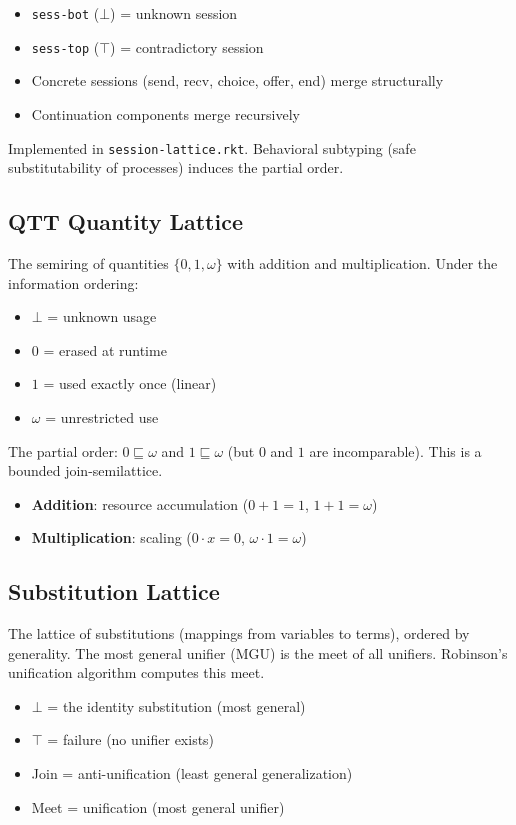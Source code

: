 \documentclass[11pt]{article}
\begin{document}
\begin{itemize}
\item \texttt{sess-bot} (\(\bot\)) = unknown session
\item \texttt{sess-top} (\(\top\)) = contradictory session
\item Concrete sessions (send, recv, choice, offer, end) merge structurally
\item Continuation components merge recursively
\end{itemize}

Implemented in \texttt{session-lattice.rkt}. Behavioral subtyping (safe substitutability
of processes) induces the partial order.
\subsection{QTT Quantity Lattice}
\label{sec:org475da16}

The semiring of quantities \(\{0, 1, \omega\}\) with addition and multiplication.
Under the information ordering:

\begin{itemize}
\item \(\bot\) = unknown usage
\item \(0\) = erased at runtime
\item \(1\) = used exactly once (linear)
\item \(\omega\) = unrestricted use
\end{itemize}

The partial order: \(0 \sqsubseteq \omega\) and \(1 \sqsubseteq \omega\) (but \(0\)
and \(1\) are incomparable). This is a bounded join-semilattice.

\begin{itemize}
\item \textbf{Addition}: resource accumulation (\(0 + 1 = 1\), \(1 + 1 = \omega\))
\item \textbf{Multiplication}: scaling (\(0 \cdot x = 0\), \(\omega \cdot 1 = \omega\))
\end{itemize}
\subsection{Substitution Lattice}
\label{sec:org7861817}

The lattice of substitutions (mappings from variables to terms), ordered by
generality. The most general unifier (MGU) is the meet of all unifiers.
Robinson's unification algorithm computes this meet.

\begin{itemize}
\item \(\bot\) = the identity substitution (most general)
\item \(\top\) = failure (no unifier exists)
\item Join = anti-unification (least general generalization)
\item Meet = unification (most general unifier)
\end{itemize}
\end{document}

